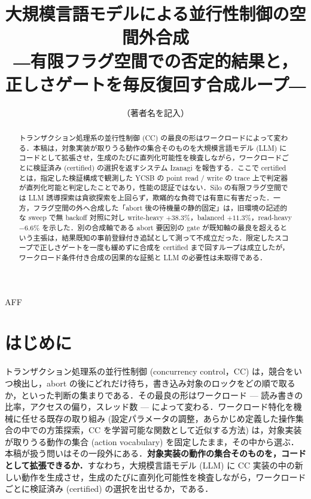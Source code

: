 \documentclass[submit,techrep,noauthor]{ipsj}
\begin{document}
\title{大規模言語モデルによる並行性制御の空間外合成\\
―有限フラグ空間での否定的結果と，\\
正しさゲートを毎反復回す合成ループ―}

\author{（著者名を記入）}{}{AFF}

\begin{abstract}
トランザクション処理系の並行性制御 (CC) の最良の形はワークロードによって変わる．本稿は，対象実装が取りうる動作の集合そのものを大規模言語モデル (LLM) にコードとして拡張させ，生成のたびに直列化可能性を検査しながら，ワークロードごとに検証済み (certified) の選択を返すシステム Izanagi を報告する．ここで certified とは，指定した検証構成で観測した YCSB の point read / write の trace 上で判定器が直列化可能と判定したことであり，性能の認証ではない．Silo の有限フラグ空間では LLM 誘導探索は貪欲探索を上回らず，欺瞞的な負荷では有意に有害だった．一方，フラグ空間の外へ合成した「abort 後の待機量の静的固定」は，旧環境の記述的な sweep で無 backoff 対照に対し write-heavy $+38.3\%$，balanced $+11.3\%$，read-heavy $-6.6\%$ を示した．別の合成軸である abort 要因別の gate が既知軸の最良を超えるという主張は，結果既知の事前登録付き追試として測って不成立だった．限定したスコープで正しさゲートを一度も緩めずに合成を certified まで回すループは成立したが，ワークロード条件付き合成の因果的な証拠と LLM の必要性は未取得である．
\end{abstract}

\maketitle

\section{はじめに}
\label{sec:intro}

トランザクション処理系の並行性制御 (concurrency control，CC) は，競合をいつ検出し，abort の後にどれだけ待ち，書き込み対象のロックをどの順で取るか，といった判断の集まりである．その最良の形はワークロード — 読み書きの比率，アクセスの偏り，スレッド数 — によって変わる．ワークロード特化を機械に任せる既存の取り組み (設定パラメータの調整，あらかじめ定義した操作集合の中での方策探索，CC を学習可能な関数として近似する方法) は，対象実装が取りうる動作の集合 (action vocabulary) を固定したまま，その中から選ぶ．本稿が扱う問いはその一段外にある．\textbf{対象実装の動作の集合そのものを，コードとして拡張できるか．}すなわち，大規模言語モデル (LLM) に CC 実装の中の新しい動作を生成させ，生成のたびに直列化可能性を検査しながら，ワークロードごとに検証済み (certified) の選択を出せるか，である．
\end{document}
